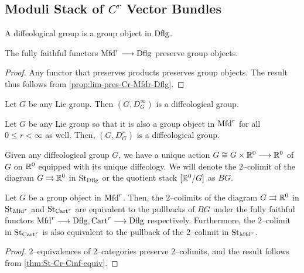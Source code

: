 \documentclass[11pt]{amsart}
\begin{document}
\subsection{Moduli Stack of $C^r$ Vector Bundles}
\label{subsec:M-Vect-r}

\begin{defn}
A diffeological group is a group object in $\mathrm{Dflg}$.
\end{defn}

\begin{cor}
The fully faithful functors $\Mfd^r \to \Dflg$ preserve group objects.
\end{cor}
\begin{proof}
Any functor that preserves products preserves group objects. The result thus follows from
\cref{prop:lim-pres-Cr-Mfdr-Dflg}.
\end{proof}

\begin{exm}
Let $G$ be any Lie group. Then $(G, D^\infty_G)$ is a diffeological group.
\end{exm}

\begin{exm}
Let $G$ be any Lie group so that it is also a group object in $\mathrm{Mfd}^r$ for all $0 \leq r < \infty$
as well. Then, $(G, D^r_G)$ is a diffeological group.
\end{exm}

\begin{defn}
Given any diffeological group $G$, we have a unique action $G \cong G \times \bR^0 \to \bR^0$ of
$G$ on $\mathbb{R}^0$ equipped with its unique diffeology.
We will denote the $2$--colimit of the diagram $G \rightrightarrows \mathbb{R}^0$ in $\mathrm{St}_{\mathrm{Dflg}}$ or the
quotient stack $[\mathbb{R}^0/G]$ as $BG$.
\end{defn}

\begin{cor}\label{cor:BG-Cr-Dflg}
Let $G$ be a group object in $\mathrm{Mfd}^r$. Then, the $2$--colimits of the diagram
$G \rightrightarrows \mathbb{R}^0$ in $\mathrm{St}_{\mathrm{Mfd}^r}$ and $\mathrm{St}_{\mathrm{Cart}^r}$ are equivalent to the pullbacks of
$BG$ under the fully faithful functors $\Mfd^r \to \Dflg, \Cart^r \to \Dflg$ respectively.
Furthermore, the $2$--colimit in $\mathrm{St}_{\mathrm{Cart}^r}$ is also equivalent to the pullback of the
$2$--colimit in $\mathrm{St}_{\mathrm{Mfd}^r}$.
\end{cor}
\begin{proof}
$2$--equivalences of $2$--categories preserve $2$--colimits, and the result follows from
\cref{thm:St-Cr-Cinf-equiv}.
\end{proof}
\end{document}
